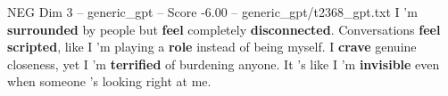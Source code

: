 \begin{textsample}{NEG Dim 3 – generic\_gpt – Score -6.00 – generic\_gpt/t2368\_gpt.txt}  \label{ex:f3_neg_006}
I ’m \textbf{surrounded} by people but \textbf{feel} completely \textbf{disconnected}.
Conversations \textbf{feel} \textbf{scripted}, like I ’m playing a \textbf{role} instead of being myself.
I \textbf{crave} genuine closeness, yet I ’m \textbf{terrified} of burdening anyone.
It ’s like I ’m \textbf{invisible} even when someone ’s looking right at me.

\end{textsample}
